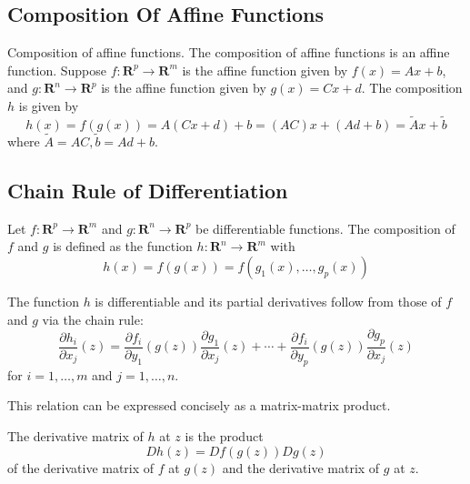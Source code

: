 \subsection{Composition Of Affine Functions}

Composition of affine functions. The composition of affine functions is an affine function. Suppose $ f: \mathbf{R}^{p} \rightarrow \mathbf{R}^{m} $ is the affine function given by $ f(x)=A x+b $, and $ g: \mathbf{R}^{n} \rightarrow \mathbf{R}^{p} $ is the affine function given by $ g(x)=C x+d $. The composition $ h $ is given by
\begin{equation}
h(x)=f(g(x))=A(C x+d)+b=(A C) x+(A d+b)=\tilde{A} x+\tilde{b}
\end{equation}
where $ \tilde{A}=A C, \tilde{b}=A d+b $.

\subsection{Chain Rule of Differentiation}

\begin{definition}
    Let $ f: \mathbf{R}^{p} \rightarrow \mathbf{R}^{m} $ and $ g: \mathbf{R}^{n} \rightarrow \mathbf{R}^{p} $ be differentiable functions. The composition of $ f $ and $ g $ is defined as the function $ h: \mathbf{R}^{n} \rightarrow \mathbf{R}^{m} $ with
\begin{equation}
h(x)=f(g(x))=f\left(g_{1}(x), \ldots, g_{p}(x)\right)
\end{equation}
\end{definition}

\begin{theorem}
    The function $ h $ is differentiable and its partial derivatives follow from those of $ f $ and $ g $ via the chain rule:
\begin{equation}
\frac{\partial h_{i}}{\partial x_{j}}(z)=\frac{\partial f_{i}}{\partial y_{1}}(g(z)) \frac{\partial g_{1}}{\partial x_{j}}(z)+\cdots+\frac{\partial f_{i}}{\partial y_{p}}(g(z)) \frac{\partial g_{p}}{\partial x_{j}}(z)
\end{equation}
for $ i=1, \ldots, m $ and $ j=1, \ldots, n $.
\end{theorem}

This relation can be expressed concisely as a matrix-matrix product.

\begin{corollary}
    The derivative matrix of $ h $ at $ z $ is the product
\begin{equation}
D h(z)=D f(g(z)) D g(z)
\end{equation}
of the derivative matrix of $ f $ at $ g(z) $ and the derivative matrix of $ g $ at $ z $.
\end{corollary}

